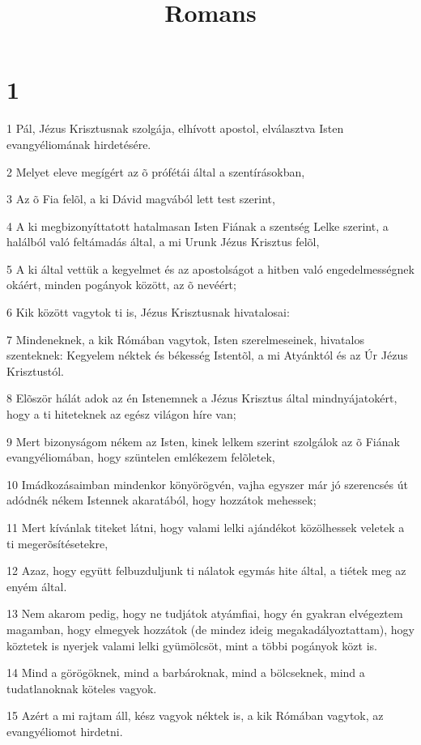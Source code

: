 

\title{Romans}


\chapter{1}

\par 1 Pál, Jézus Krisztusnak szolgája, elhívott apostol, elválasztva Isten evangyéliomának hirdetésére.
\par 2 Melyet eleve megígért az õ prófétái által a szentírásokban,
\par 3 Az õ Fia felõl, a ki Dávid magvából lett test szerint,
\par 4 A ki megbizonyíttatott hatalmasan Isten Fiának a szentség Lelke szerint, a halálból való feltámadás által, a mi Urunk Jézus Krisztus felõl,
\par 5 A ki által vettük a kegyelmet és az apostolságot a hitben való engedelmességnek okáért, minden pogányok között, az õ nevéért;
\par 6 Kik között vagytok ti is, Jézus Krisztusnak hivatalosai:
\par 7 Mindeneknek, a kik Rómában vagytok, Isten szerelmeseinek, hivatalos szenteknek: Kegyelem néktek és békesség Istentõl, a mi Atyánktól és az Úr Jézus Krisztustól.
\par 8 Elõször hálát adok az én Istenemnek a Jézus Krisztus által mindnyájatokért, hogy a ti hiteteknek az egész világon híre van;
\par 9 Mert bizonyságom nékem az Isten, kinek lelkem szerint szolgálok az õ Fiának evangyéliomában, hogy szüntelen emlékezem felõletek,
\par 10 Imádkozásaimban mindenkor könyörögvén, vajha egyszer már jó szerencsés út adódnék nékem Istennek akaratából, hogy hozzátok mehessek;
\par 11 Mert kívánlak titeket látni, hogy valami lelki ajándékot közölhessek veletek a ti megerõsítésetekre,
\par 12 Azaz, hogy együtt felbuzduljunk ti nálatok egymás hite által, a tiétek meg az enyém által.
\par 13 Nem akarom pedig, hogy ne tudjátok atyámfiai, hogy én gyakran elvégeztem magamban, hogy elmegyek hozzátok (de mindez ideig megakadályoztattam), hogy köztetek is nyerjek valami lelki gyümölcsöt, mint a többi pogányok közt is.
\par 14 Mind a görögöknek, mind a barbároknak, mind a bölcseknek, mind a tudatlanoknak köteles vagyok.
\par 15 Azért a mi rajtam áll, kész vagyok néktek is, a kik Rómában vagytok, az evangyéliomot hirdetni.
